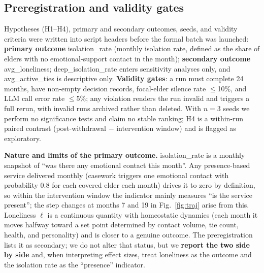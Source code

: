 \documentclass[10pt,twocolumn]{article}
\begin{document}
\subsection{Preregistration and validity gates}\label{sec:prereg}
Hypotheses (H1--H4), primary and secondary outcomes, seeds, and validity criteria were written into script headers before the formal batch was launched:
\textbf{primary outcome} isolation\_rate (monthly isolation rate, defined as the share of elders with no emotional-support contact in the month); \textbf{secondary outcome} avg\_loneliness; deep\_isolation\_rate enters sensitivity analyses only, and avg\_active\_ties is descriptive only. \textbf{Validity gates}: a run must complete 24 months, have non-empty decision records, focal-elder silence rate $\le$10\%, and LLM call error rate $\le$5\%; any violation renders the run invalid and triggers a full rerun, with invalid runs archived rather than deleted. With $n=3$ seeds we perform no significance tests and claim no stable ranking; H4 is a within-run paired contrast (post-withdrawal $-$ intervention window) and is flagged as exploratory.

\textbf{Nature and limits of the primary outcome.} isolation\_rate is a monthly snapshot of ``was there any emotional contact this month''. Any presence-based service delivered monthly (casework triggers one emotional contact with probability 0.8 for each covered elder each month) drives it to zero by definition, so within the intervention window the indicator mainly measures ``is the service present''; the step changes at months 7 and 19 in Fig.~\ref{fig:traj} arise from this. Loneliness $\ell$ is a continuous quantity with homeostatic dynamics (each month it moves halfway toward a set point determined by contact volume, tie count, health, and personality) and is closer to a genuine outcome. The preregistration lists it as secondary; we do not alter that status, but we \textbf{report the two side by side} and, when interpreting effect sizes, treat loneliness as the outcome and the isolation rate as the ``presence'' indicator.
\end{document}
